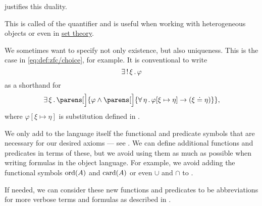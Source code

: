\begin{remark}
\begin{thmenum}
     justifies this duality.

    This is called  of the quantifier and is useful when working with heterogeneous objects or even in \hyperref[sec:set_theory]{set theory}.

     We sometimes want to specify not only existence, but also uniqueness. This is the case in \eqref{eq:def:zfc/choice}, for example. It is conventional to write
    \begin{equation*}
      \exists \thinspace ! \thinspace \xi \thinspace . \thinspace \varphi
    \end{equation*}
    as a shorthand for
    \begin{equation*}
      \qexists \xi \parens[\Big]{ \varphi \wedge \parens[\Big]{ \qforall \eta \varphi[\xi \mapsto \eta] \rightarrow (\xi \doteq \eta) } },
    \end{equation*}
    where \( \varphi[\xi \mapsto \eta] \) is substitution defined in .

     We only add to the language itself the functional and predicate symbols that are necessary for our desired axioms --- see . We can define additional functions and predicates in terms of these, but we avoid using them as much as possible when writing formulas in the object language. For example, we avoid adding the functional symbols \hyperref[thm:well_ordered_order_type_existence]{\( \operatorname{ord}(A) \)} and \hyperref[def:cardinal]{\( \operatorname{card}(A) \)} or even \hyperref[def:basic_set_operations/union]{\( \cup \)} and \hyperref[def:basic_set_operations/intersection]{\( \cap \)} to \hyperref[def:zfc]{}.

    If needed, we can consider these new functions and predicates to be abbreviations for more verbose terms and formulas as described in .
  \end{thmenum}
\end{remark}

